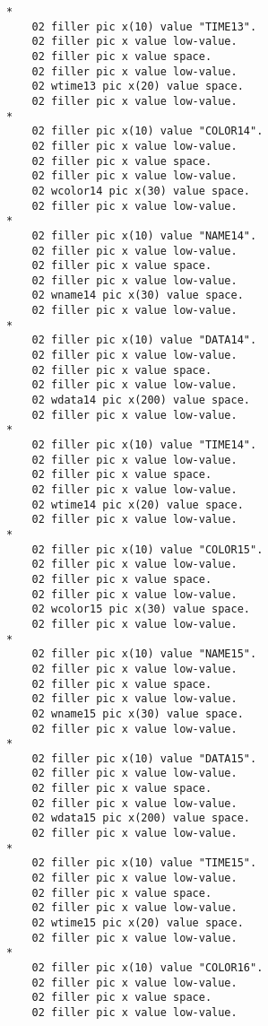 {{{\begin{verbatim}
      *    
          02 filler pic x(10) value "TIME13".
          02 filler pic x value low-value.
          02 filler pic x value space.
          02 filler pic x value low-value.
          02 wtime13 pic x(20) value space.
          02 filler pic x value low-value.
      *    
          02 filler pic x(10) value "COLOR14".
          02 filler pic x value low-value.
          02 filler pic x value space.
          02 filler pic x value low-value.
          02 wcolor14 pic x(30) value space.
          02 filler pic x value low-value.
      *    
          02 filler pic x(10) value "NAME14".
          02 filler pic x value low-value.
          02 filler pic x value space.
          02 filler pic x value low-value.
          02 wname14 pic x(30) value space.
          02 filler pic x value low-value.
      *    
          02 filler pic x(10) value "DATA14".
          02 filler pic x value low-value.
          02 filler pic x value space.
          02 filler pic x value low-value.
          02 wdata14 pic x(200) value space.
          02 filler pic x value low-value.
      *    
          02 filler pic x(10) value "TIME14".
          02 filler pic x value low-value.
          02 filler pic x value space.
          02 filler pic x value low-value.
          02 wtime14 pic x(20) value space.
          02 filler pic x value low-value.
      *    
          02 filler pic x(10) value "COLOR15".
          02 filler pic x value low-value.
          02 filler pic x value space.
          02 filler pic x value low-value.
          02 wcolor15 pic x(30) value space.
          02 filler pic x value low-value.
      *    
          02 filler pic x(10) value "NAME15".
          02 filler pic x value low-value.
          02 filler pic x value space.
          02 filler pic x value low-value.
          02 wname15 pic x(30) value space.
          02 filler pic x value low-value.
      *    
          02 filler pic x(10) value "DATA15".
          02 filler pic x value low-value.
          02 filler pic x value space.
          02 filler pic x value low-value.
          02 wdata15 pic x(200) value space.
          02 filler pic x value low-value.
      *    
          02 filler pic x(10) value "TIME15".
          02 filler pic x value low-value.
          02 filler pic x value space.
          02 filler pic x value low-value.
          02 wtime15 pic x(20) value space.
          02 filler pic x value low-value.
      *    
          02 filler pic x(10) value "COLOR16".
          02 filler pic x value low-value.
          02 filler pic x value space.
          02 filler pic x value low-value.

\end{verbatim}}}}
